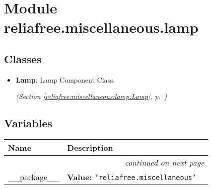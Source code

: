 %
%
%


\section{Module reliafree.miscellaneous.lamp}

    \label{reliafree:miscellaneous:lamp}


\subsection{Classes}

\begin{itemize}  \setlength{\parskip}{0ex}
  \item \textbf{Lamp}: Lamp Component Class.



  \textit{(Section \ref{reliafree:miscellaneous:lamp:Lamp}, p.~\pageref{reliafree:miscellaneous:lamp:Lamp})}

\end{itemize}


  \subsection{Variables}

    \vspace{-1cm}
\hspace{\varindent}\begin{longtable}{|p{\varnamewidth}|p{\vardescrwidth}|l}
\cline{1-2}
\cline{1-2} \centering \textbf{Name} & \centering \textbf{Description}& \\
\cline{1-2}
\endhead\cline{1-2}\multicolumn{3}{r}{\small\textit{continued on next page}}\\\endfoot\cline{1-2}
\endlastfoot\raggedright \_\-\_\-p\-a\-c\-k\-a\-g\-e\-\_\-\_\- & \raggedright \textbf{Value:} 
{\tt \texttt{'}\texttt{reliafree.miscellaneous}\texttt{'}}&\\
\cline{1-2}
\end{longtable}

